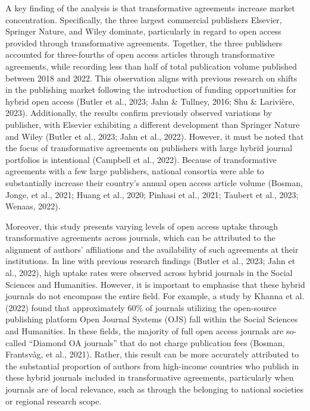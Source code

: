 \documentclass[a4paper,man,floatsintext,longtable,noextraspace,12pt]{apa6}
\begin{document}
A key finding of the analysis is that transformative agreements increase
market concentration. Specifically, the three largest commercial
publishers Elsevier, Springer Nature, and Wiley dominate, particularly
in regard to open access provided through transformative agreements.
Together, the three publishers accounted for three-fourths of open
access articles through transformative agreements, while recording less
than half of total publication volume published between 2018 and 2022.
This observation aligns with previous research on shifts in the
publishing market following the introduction of funding opportunities
for hybrid open access (Butler et al., 2023; Jahn \& Tullney, 2016; Shu
\& Larivière, 2023). Additionally, the results confirm previously
observed variations by publisher, with Elsevier exhibiting a different
development than Springer Nature and Wiley (Butler et al., 2023; Jahn et
al., 2022). However, it must be noted that the focus of transformative
agreements on publishers with large hybrid journal portfolios is
intentional (Campbell et al., 2022). Because of transformative
agreements with a few large publishers, national consortia were able to
substantially increase their country's annual open access article volume
(Bosman, Jonge, et al., 2021; Huang et al., 2020; Pinhasi et al., 2021;
Taubert et al., 2023; Wenaas, 2022).

Moreover, this study presents varying levels of open access uptake
through transformative agreements across journals, which can be
attributed to the alignment of authors' affiliations and the
availability of such agreements at their institutions. In line with
previous research findings (Butler et al., 2023; Jahn et al., 2022),
high uptake rates were observed across hybrid journals in the Social
Sciences and Humanities. However, it is important to emphasise that
these hybrid journals do not encompass the entire field. For example, a
study by Khanna et al. (2022) found that approximately 60\% of journals
utilizing the open-source publishing platform Open Journal Systems (OJS)
fall within the Social Sciences and Humanities. In these fields, the
majority of full open access journals are so-called ``Diamond OA
journals'' that do not charge publication fees (Bosman, Frantsvåg, et
al., 2021). Rather, this result can be more accurately attributed to the
substantial proportion of authors from high-income countries who publish
in these hybrid journals included in transformative agreements,
particularly when journals are of local relevance, such as through the
belonging to national societies or regional research scope.
\end{document}

